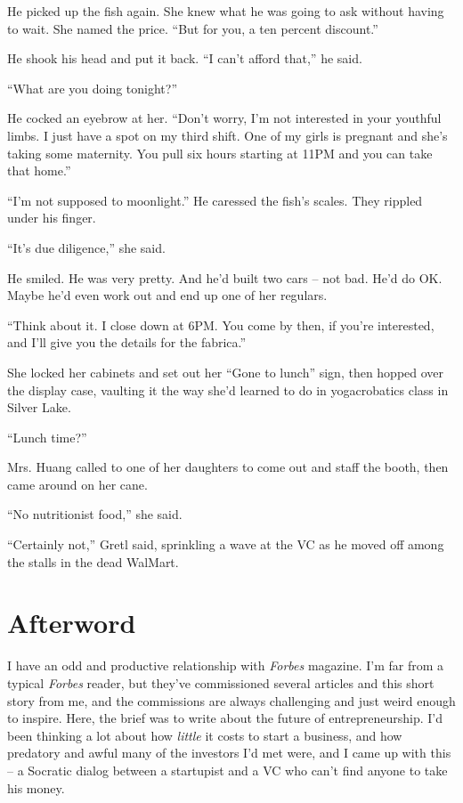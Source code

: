 He picked up the fish again. She knew what he was going to ask without 
having to wait. She named the price. “But for you, a ten percent 
discount.”

He shook his head and put it back. “I can't afford that,” he said.

“What are you doing tonight?”

He cocked an eyebrow at her. “Don't worry, I'm not interested in your 
youthful limbs. I just have a spot on my third shift. One of my girls 
is pregnant and she's taking some maternity. You pull six hours 
starting at 11PM and you can take that home.”

“I'm not supposed to moonlight.” He caressed the fish's scales. 
They rippled under his finger.

“It's due diligence,” she said.

He smiled. He was very pretty. And he'd built two cars -- not bad. He'd 
do OK. Maybe he'd even work out and end up one of her regulars.

“Think about it. I close down at 6PM. You come by then, if you're 
interested, and I'll give you the details for the fabrica.”

She locked her cabinets and set out her “Gone to lunch” sign, then 
hopped over the display case, vaulting it the way she'd learned to do 
in yogacrobatics class in Silver Lake.

“Lunch time?”

Mrs. Huang called to one of her daughters to come out and staff the 
booth, then came around on her cane.

“No nutritionist food,” she said.

“Certainly not,” Gretl said, sprinkling a wave at the VC as he 
moved off among the stalls in the dead WalMart.

\section{Afterword}

I have an odd and productive relationship with \emph{Forbes} magazine. 
I'm far from a typical \emph{Forbes} reader, but they've commissioned 
several articles and this short story from me, and the commissions are 
always challenging and just weird enough to inspire. Here, the brief 
was to write about the future of entrepreneurship. I'd been thinking a 
lot about how \emph{little} it costs to start a business, and how 
predatory and awful many of the investors I'd met were, and I came up 
with this -- a Socratic dialog between a startupist and a VC who can't 
find anyone to take his money.


